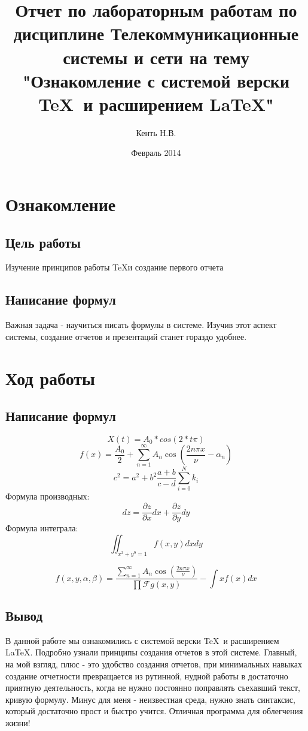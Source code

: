 \documentclass[10pt,a4paper]{report}
\author{Кенть Н.В.}
\title{Отчет по лабораторным работам по дисциплине Телекоммуникационные системы и сети\newline
на тему "Ознакомление с системой верски \TeX\ и расширением \LaTeX "}
\date{Февраль 2014}
\begin{document}
\maketitle
\pagebreak
\chapter{Ознакомление}
\section{Цель работы}
Изучение принципов работы \TeX и создание первого отчета
\section{Написание формул}
Важная задача - научиться писать формулы в системе. Изучив этот аспект системы, создание отчетов и презентаций  станет гораздо удобнее.


\chapter{Ход работы}
\section{Написание формул}
\begin{displaymath}
X(t) = A_0 * cos(2*t\pi)
\end{displaymath}
\begin{displaymath}
f(x) = \frac{A_0}{2} + \sum \limits_{n=1}^{\infty} A_n \cos \left( \frac{2 n \pi x}{\nu} - \alpha_n \right)
\end{displaymath}
\begin{displaymath}
c^2 = a^2 + b^2 \frac{a+b}{c-d} \sum_{i=0}^{N}k _i
\end{displaymath}
Формула производных:
\begin{displaymath}
dz = \frac{\partial z}{\partial x} dx + \frac{\partial z}{\partial y} dy
\end{displaymath}
Формула интеграла:
\begin{displaymath}
\iint_{x^2 + y^9 = 1} f(x, y) dx dy 
\end{displaymath}

\begin{displaymath}
f(x,y,\alpha, \beta) = \frac{\sum \limits_{n=1}^{\infty} 
A_n \cos \left( \frac{2 n \pi x}{\nu} \right)} {\prod \mathcal{F} {g(x,y)} }-\int{x} f(x) dx
\end{displaymath}
\section{Вывод}
В данной работе мы ознакомились  с системой верски \TeX\ и расширением \LaTeX. Подробно узнали принципы создания отчетов в этой системе. Главный, на мой взгляд, плюс - это удобство создания отчетов, при минимальных навыках создание отчетности превращается из рутинной, нудной работы в достаточно приятную деятельность, когда не нужно постоянно поправлять съехавший текст, кривую формулу. Минус для меня - неизвестная среда, нужно знать синтаксис, который достаточно прост и быстро учится. Отличная программа для облегчения жизни!
\end{document}
